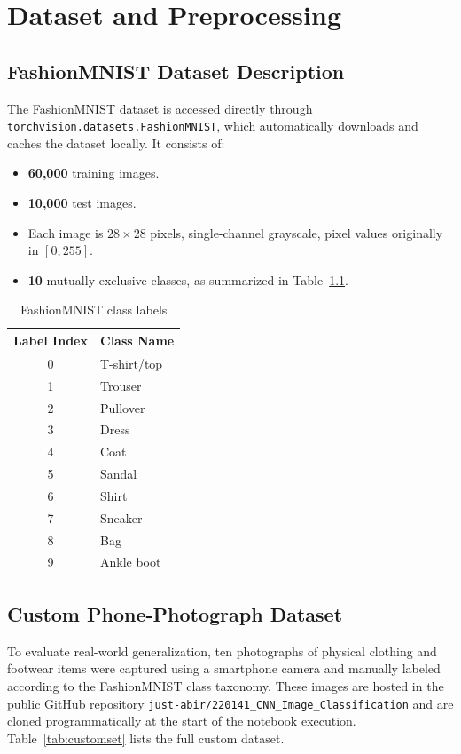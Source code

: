 \documentclass[12pt,a4paper]{report}
\begin{document}
\chapter{Dataset and Preprocessing}

\section{FashionMNIST Dataset Description}
The FashionMNIST dataset is accessed directly through \texttt{torchvision.datasets.FashionMNIST}, which automatically downloads and caches the dataset locally. It consists of:

\begin{itemize}
    \item \textbf{60,000} training images.
    \item \textbf{10,000} test images.
    \item Each image is $28 \times 28$ pixels, single-channel grayscale, pixel values originally in $[0, 255]$.
    \item \textbf{10} mutually exclusive classes, as summarized in Table~\ref{tab:classes}.
\end{itemize}

\begin{table}[H]
\centering
\caption{FashionMNIST class labels}
\label{tab:classes}
\begin{tabular}{@{}cl@{}}
\toprule
\textbf{Label Index} & \textbf{Class Name} \\
\midrule
0 & T-shirt/top \\
1 & Trouser \\
2 & Pullover \\
3 & Dress \\
4 & Coat \\
5 & Sandal \\
6 & Shirt \\
7 & Sneaker \\
8 & Bag \\
9 & Ankle boot \\
\bottomrule
\end{tabular}
\end{table}

\section{Custom Phone-Photograph Dataset}
To evaluate real-world generalization, ten photographs of physical clothing and footwear items were captured using a smartphone camera and manually labeled according to the FashionMNIST class taxonomy. These images are hosted in the public GitHub repository \texttt{just-abir/220141\_CNN\_Image\_Classification} and are cloned programmatically at the start of the notebook execution. Table~\ref{tab:customset} lists the full custom dataset.
\end{document}
